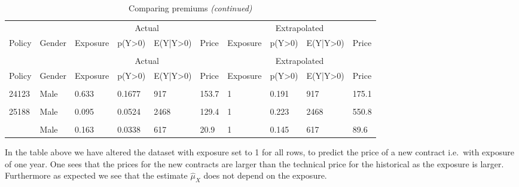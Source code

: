 \documentclass[
]{article}
\begin{document}
\begin{longtable}[t]{llllllllll}
\caption{\label{tab:unnamed-chunk-7}Comparing premiums}\\
\toprule
\multicolumn{2}{c}{ } & \multicolumn{4}{c}{Actual} & \multicolumn{4}{c}{Extrapolated} \\
\cmidrule(l{3pt}r{3pt}){3-6} \cmidrule(l{3pt}r{3pt}){7-10}
Policy & Gender & Exposure & p(Y>0) & E(Y|Y>0) & Price & Exposure & p(Y>0) & E(Y|Y>0) & Price\\
\midrule
\endfirsthead
\caption[]{Comparing premiums \textit{(continued)}}\\
\toprule
\multicolumn{2}{c}{ } & \multicolumn{4}{c}{Actual} & \multicolumn{4}{c}{Extrapolated} \\
\cmidrule(l{3pt}r{3pt}){3-6} \cmidrule(l{3pt}r{3pt}){7-10}
Policy & Gender & Exposure & p(Y>0) & E(Y|Y>0) & Price & Exposure & p(Y>0) & E(Y|Y>0) & Price\\
\midrule
\endhead

\endfoot
\bottomrule
\endlastfoot
\cellcolor{gray!6}{6254} & \cellcolor{gray!6}{Female} & \cellcolor{gray!6}{0.083} & \cellcolor{gray!6}{0.0465} & \cellcolor{gray!6}{1051} & \cellcolor{gray!6}{48.9} & \cellcolor{gray!6}{1} & \cellcolor{gray!6}{0.154} & \cellcolor{gray!6}{1051} & \cellcolor{gray!6}{161.5}\\
24123 & Male & 0.633 & 0.1677 & 917 & 153.7 & 1 & 0.191 & 917 & 175.1\\
\cellcolor{gray!6}{25010} & \cellcolor{gray!6}{Female} & \cellcolor{gray!6}{0.208} & \cellcolor{gray!6}{0.1097} & \cellcolor{gray!6}{1226} & \cellcolor{gray!6}{134.4} & \cellcolor{gray!6}{1} & \cellcolor{gray!6}{0.499} & \cellcolor{gray!6}{1226} & \cellcolor{gray!6}{611.8}\\
25188 & Male & 0.095 & 0.0524 & 2468 & 129.4 & 1 & 0.223 & 2468 & 550.8\\
\cellcolor{gray!6}{30495} & \cellcolor{gray!6}{Female} & \cellcolor{gray!6}{0.751} & \cellcolor{gray!6}{0.1034} & \cellcolor{gray!6}{755} & \cellcolor{gray!6}{78.1} & \cellcolor{gray!6}{1} & \cellcolor{gray!6}{0.113} & \cellcolor{gray!6}{755} & \cellcolor{gray!6}{85.5}\\
\addlinespace
30555 & Male & 0.163 & 0.0338 & 617 & 20.9 & 1 & 0.145 & 617 & 89.6\\*
\end{longtable}

In the table above we have altered the dataset with exposure set to 1
for all rows, to predict the price of a new contract i.e.~with exposure
of one year. One sees that the prices for the new contracts are larger
than the technical price for the historical as the exposure is larger.
Furthermore as expected we see that the estimate \(\hat \mu_X\) does not
depend on the exposure.
\end{document}
